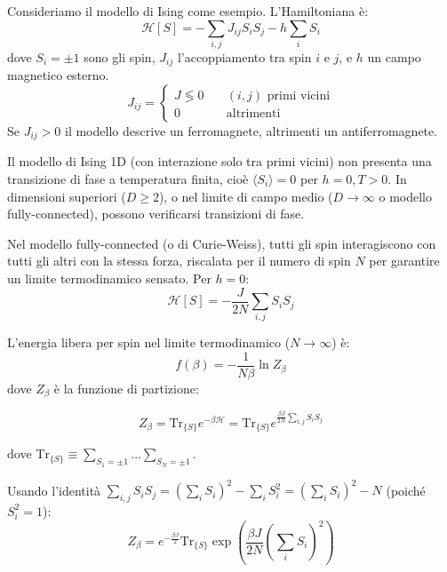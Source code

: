 Consideriamo il modello di Ising come esempio. L'Hamiltoniana è:
\begin{equation}
\mathcal{H}[S]=-\sum_{i,j}J_{ij}S_{i}S_{j}-h\sum_{i}S_{i}
\end{equation}
dove $S_i=\pm 1$ sono gli spin, $J_{ij}$ l'accoppiamento tra spin $i$ e $j$, e $h$ un campo magnetico esterno.
\begin{equation} 
J_{ij} = \begin{cases} J \lessgtr 0 \quad & (i,j) \text{ primi vicini} \\ 0 \quad &\text{altrimenti} \end{cases} 
\end{equation}
Se $J_{ij}>0$ il modello descrive un ferromagnete, altrimenti un antiferromagnete.

Il modello di Ising 1D (con interazione solo tra primi vicini) non presenta una transizione di fase a temperatura finita, cioè $\langle S_i \rangle = 0$ per $h=0, T>0$. In dimensioni superiori ($D \ge 2$), o nel limite di campo medio ($D\rightarrow\infty$ o modello fully-connected), possono verificarsi transizioni di fase.

Nel modello fully-connected (o di Curie-Weiss), tutti gli spin interagiscono con tutti gli altri con la stessa forza, riscalata per il numero di spin $N$ per garantire un limite termodinamico sensato. Per $h=0$:
\begin{equation}
\mathcal{H}[S]=-\frac{J}{2N}\sum_{i,j}S_{i}S_{j}
\end{equation}

L'energia libera per spin nel limite termodinamico ($N\rightarrow\infty$) è:
\begin{equation} 
f(\beta) = -\frac{1}{N\beta}\ln Z_{\beta} 
\end{equation}
dove $Z_\beta$ è la funzione di partizione:
\begin{tcolorbox}[
    colback=colorA!5,      
    colframe=colorA,       
    arc=3mm,               
    boxrule=1.2pt
]
\begin{equation}
Z_{\beta}=\text{Tr}_{\{S\}}e^{-\beta \mathcal{H}} = \text{Tr}_{\{S\}}e^{\frac{\beta J}{2N}\sum_{i,j}S_{i}S_{j}}
\end{equation}
\end{tcolorbox}
dove $\text{Tr}_{\{S\}} \equiv \sum_{S_1=\pm1} \dots \sum_{S_N=\pm1}$.

Usando l'identità $\sum_{i,j}S_{i}S_{j} = (\sum_{i}S_{i})^{2} - \sum_{i}S_{i}^{2} = (\sum_{i}S_{i})^{2}-N$ (poiché $S_i^2=1$):
\begin{equation}
Z_{\beta} = e^{-\frac{\beta J}{2}} \text{Tr}_{\{S\}} \exp\left(\frac{\beta J}{2N}\left(\sum_{i}S_{i}\right)^{2}\right)
\end{equation}

